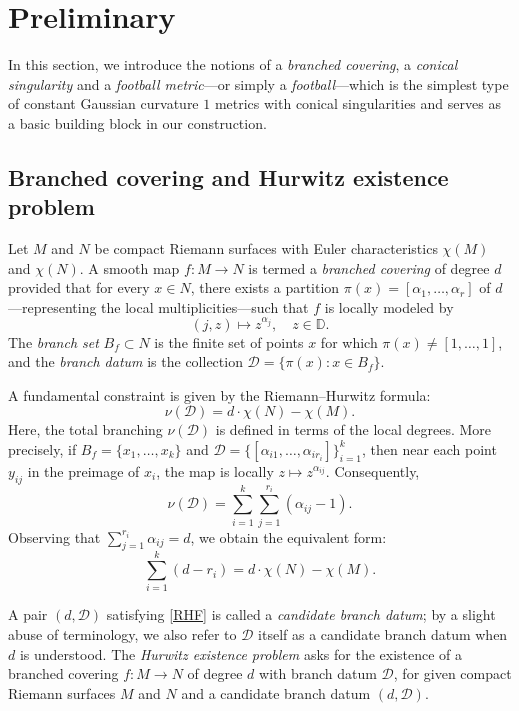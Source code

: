 \documentclass[microtype]{gtpart}     %
\theoremstyle{definition}
\begin{document}
\section{Preliminary}
In this section, we introduce the notions of a \emph{branched covering}, a \emph{conical singularity} and a \emph{football metric}---or simply a \emph{football}---which is the simplest type of constant Gaussian curvature $1$ metrics with conical singularities and serves as a basic building block in our construction.


\subsection{Branched covering and Hurwitz existence problem}


Let \( M \) and \( N \) be compact Riemann surfaces with Euler characteristics \( \chi(M) \) and \( \chi(N) \). A smooth map \( f: M \to N \) is termed a \emph{branched covering} of degree \( d \) provided that for every \( x \in N \), there exists a partition \( \pi(x) = [\alpha_1, \ldots, \alpha_r] \) of \( d \)---representing the local multiplicities---such that \( f \) is locally modeled by
\[
(j, z) \mapsto z^{\alpha_j}, \quad z \in \mathbb{D}.
\]
The \emph{branch set} \( B_f \subset N \) is the finite set of points \( x \) for which \( \pi(x) \neq [1, \ldots, 1] \), and the \emph{branch datum} is the collection \( \mathcal{D} = \{\pi(x) : x \in B_f\} \).

A fundamental constraint is given by the Riemann--Hurwitz formula:
\begin{equation}\label{RHF}
\nu(\mathcal{D}) = d \cdot \chi(N) - \chi(M).
\end{equation}
Here, the total branching \( \nu(\mathcal{D}) \) is defined in terms of the local degrees. More precisely, if \( B_f = \{x_1, \ldots, x_k\} \) and \( \mathcal{D} = \{[\alpha_{i1}, \ldots, \alpha_{ir_i}]\}_{i=1}^k \), then near each  point \( y_{ij} \) in the preimage of \( x_i \), the map is locally \( z \mapsto z^{\alpha_{ij}} \). Consequently,
\[
\nu(\mathcal{D}) = \sum_{i=1}^{k} \sum_{j=1}^{r_i} (\alpha_{ij} - 1).
\]
Observing that \( \sum\limits_{j=1}^{r_i} \alpha_{ij} = d \), we obtain the equivalent form:
\begin{equation}\label{RHF-1}
\sum_{i=1}^{k} (d - r_i) = d \cdot \chi(N) - \chi(M).
\end{equation}

A pair \((d, \mathcal{D})\) satisfying \eqref{RHF} is called a \emph{candidate branch datum}; by a slight abuse of terminology, we also refer to \(\mathcal{D}\) itself as a candidate branch datum when \(d\) is understood. The \emph{Hurwitz existence problem} asks for the existence of a branched covering \(f: M \to N\) of degree \(d\) with branch datum \(\mathcal{D}\), for given compact Riemann surfaces \(M\) and \(N\) and a candidate branch datum \((d, \mathcal{D})\).
\end{document}
